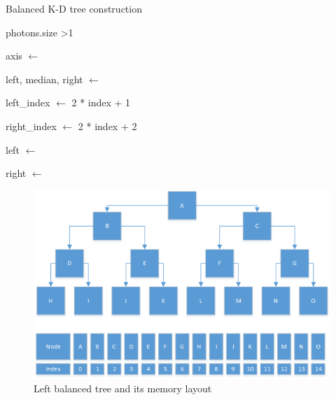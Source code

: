 \begin{algorithm}
\begin{algorithmic}
\caption{Balanced K-D tree construction}
\If
{
photons.size \textgreater 1
}
{

	axis $\gets$ 

	left, median, right $\gets$ 

	left\_index  $\gets$ 2 * index + 1

	right\_index $\gets$ 2 * index + 2

	{

		left $\gets$ 
	}
	\EndIf

	{

		right $\gets$ 
	}
	\EndIf

}
\Else
{

}
\EndIf
\EndFunction
%
%
%
%
%
%
%
%

\end{algorithmic}
\end{algorithm}

\begin{figure}
\centering
\includegraphics[scale=0.75]{./images/left-balanced-tree.png}
\caption{Left balanced tree and its memory layout}
\end{figure}

